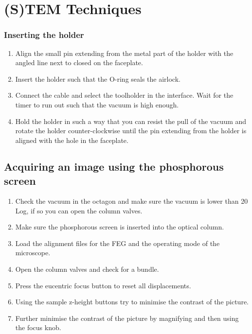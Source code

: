 \documentclass[a4paper]{scrartcl}
\begin{document}
\section*{(S)TEM  Techniques}

\subsubsection*{Inserting the holder}
\begin{enumerate}
    \item Align the small pin extending from the metal part of the holder with the angled line next to closed on the faceplate.
    \item Insert the holder such that the O-ring seals the airlock.
    \item Connect the cable and select the toolholder in the interface. Wait for the timer to run out such that the vacuum is high enough.
    \item Hold the holder in such a way that you can resist the pull of the vacuum and rotate the holder counter-clockwise until the pin extending from the holder is aligned with the hole in the faceplate.
\end{enumerate}


\subsection*{Acquiring an image using the phosphorous screen}
\begin{enumerate}
    \item Check the vacuum in the octagon and make sure the vacuum is lower than 20 Log, if so you can open the column valves.
    \item Make sure the phosphorous screen is inserted into the optical column.
    \item Load the alignment files for the FEG and the operating mode of the microscope.
    \item Open the column valves and check for a bundle.
    \item Press the eucentric focus button to reset all displacements.
    \item Using the sample z-height buttons try to minimise the contrast of the picture.
    \item Further minimise the contrast of the picture by magnifying and then using the focus knob.
\end{enumerate}
\end{document}

